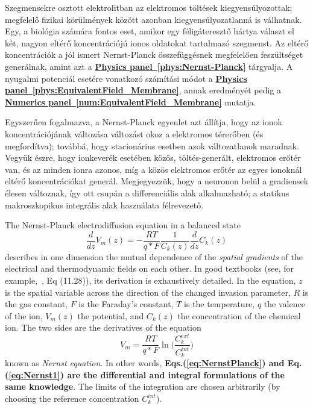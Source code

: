 \else

Szegmensekre osztott elektrolitban az elektromos töltések kiegyensúlyozottak; megfelelő fizikai körülmények között
azonban kiegyensúlyozatlanná is válhatnak.
Egy, a biológia számára fontos eset, amikor egy féligáteresztő hártya
választ el két, nagyon eltérő koncentrációjú ionos oldatokat
tartalmazó szegmenst. Az eltérő koncentrációk 
a jól ismert Nernst-Planck összefüggésnek megfelelően feszültséget generálnak, amint azt a 
\hyperlink{phys:Nernst-Planck}
{\textbf{Physics panel~\ref{phys:Nernst-Planck}}} tárgyalja.
A nyugalmi potenciál esetére vonatkozó számítási módot a \hyperlink{phys:EquivalentField_Membrane}
{\textbf{Physics panel~\ref{phys:EquivalentField_Membrane}}},
annak eredményét pedig a 
\hyperlink{num:EquivalentField_Membrane}
{\textbf{Numerics panel~\ref{num:EquivalentField_Membrane}}} mutatja.

Egyszerűen fogalmazva, a Nernst-Planck egyenlet azt állítja,
hogy az ionok koncentrációjának változása változást okoz a
elektromos térerőben (és megfordítva);
továbbá, hogy stacionárius esetben azok változatlanok maradnak.
Vegyük észre, hogy ionkeverék esetében közös, töltés-generált,
elektromos erőtér van, és az minden ionra azonos, míg a közös
elektromos erőtér az egyes ionoknál eltérő koncentrációkat generál. 
Megjegyezzük, hogy a neuronon belül a gradiensek élesen változnak,
így ott csupán a differenciális alak alkalmazható;
a statikus makroszkopikus integrális alak használata félrevezető.
\fi

{
The Nernst-Planck electrodiffusion equation in a balanced state
\begin{equation}
	\frac{d}{dz}V_{m}(z)=-\frac{RT}{q*F}\frac{1}{C_{k}(z)}\frac{d}{dz}C_{k}(z)\label{eq:NernstPlanck}
\end{equation}
describes in one dimension the mutual dependence of the \emph{spatial gradients} of the
electrical and thermodynamic fields on each other. In good textbooks (see, for example,~\cite{KochBiophysics:1999},
Eq (11.28)), its derivation is exhaustively detailed. In the
equation, $z$ is the spatial variable across the direction of the
changed invasion parameter, $R$ is the gas constant, $F$ is the
Faraday's constant, $T$ is the temperature, $q$ the valence
of the ion, ${V_m(z)}$ the potential, and ${C_k(z)}$ the concentration
of the chemical ion. The two sides are the derivatives of the equation
\begin{equation}
	V_{m} =\frac{RT}{q*F}\ln{\biggl(\frac{C_{k}^{ext}}{C_{k}^{int}}\biggr)}\label{eq:Nernst1}
\end{equation}
\noindent known as \textit{Nernst equation}.  In other words, \textbf{Eqs.(\ref{eq:NernstPlanck}) and Eq.(\ref{eq:Nernst1}) are the differential and integral formulations of the same knowledge}. The limits of the integration are chosen arbitrarily (by choosing the reference concentration $C_{k}^{int}$).
}





